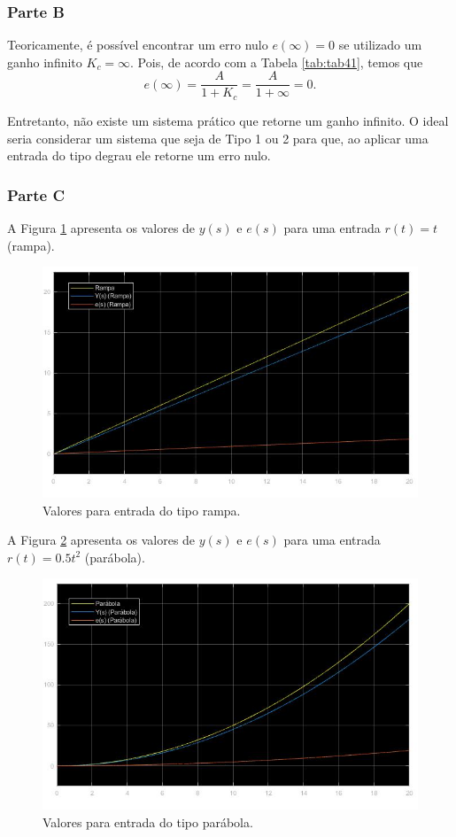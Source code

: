 \documentclass[
]{book}
\theoremstyle{definition}
\theoremstyle{definition}
\theoremstyle{definition}
\theoremstyle{remark}
\begin{document}
\hypertarget{parte-b}{%
\subsubsection*{Parte B}\label{parte-b}}

Teoricamente, é possível encontrar um erro nulo \(e(\infty) = 0\) se utilizado um ganho infinito \(K_c = \infty\). Pois, de acordo com a Tabela \ref{tab:tab41}, temos que
\[
e(\infty) = \frac {A}{1+K_c} = \frac {A}{1+\infty} = 0.
\]

Entretanto, não existe um sistema prático que retorne um ganho infinito. O ideal seria considerar um sistema que seja de Tipo 1 ou 2 para que, ao aplicar uma entrada do tipo degrau ele retorne um erro nulo.

\hypertarget{parte-c}{%
\subsubsection*{Parte C}\label{parte-c}}

A Figura \ref{fig:fig41C1} apresenta os valores de \(y(s)\) e \(e(s)\) para uma entrada \(r(t) = t\) (rampa).

\begin{figure}
\includegraphics[width=0.8\linewidth]{Imagens/Lab4/Resolução/prob1C1} \caption{Valores para entrada do tipo rampa.}\label{fig:fig41C1}
\end{figure}

A Figura \ref{fig:fig41C2} apresenta os valores de \(y(s)\) e \(e(s)\) para uma entrada \(r(t) = 0.5t^2\) (parábola).

\begin{figure}
\includegraphics[width=0.8\linewidth]{Imagens/Lab4/Resolução/prob1C2} \caption{Valores para entrada do tipo parábola.}\label{fig:fig41C2}
\end{figure}
\end{document}
